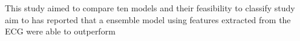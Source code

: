 This study aimed to compare ten models and their feasibility to classify    study aim to  has reported that a ensemble model using features extracted from the ECG were able to outperform 